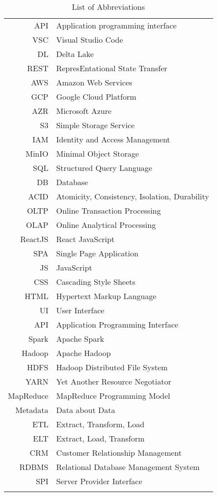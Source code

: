 \begin{longtable}{rl}
API & Application programming interface \\
VSC & Visual Studio Code \\
DL & Delta Lake \\
REST & RepresEntational State Transfer \\
AWS & Amazon Web Services \\
GCP & Google Cloud Platform \\
AZR & Microsoft Azure \\
S3 & Simple Storage Service \\
IAM & Identity and Access Management \\
MinIO & Minimal Object Storage \\
SQL & Structured Query Language \\
DB & Database \\
ACID & Atomicity, Consistency, Isolation, Durability \\
OLTP & Online Transaction Processing \\
OLAP & Online Analytical Processing \\
ReactJS & React JavaScript \\
SPA & Single Page Application \\
JS & JavaScript \\
CSS & Cascading Style Sheets \\
HTML & Hypertext Markup Language \\
UI & User Interface \\
API & Application Programming Interface \\
Spark & Apache Spark \\
Hadoop & Apache Hadoop \\
HDFS & Hadoop Distributed File System \\
YARN & Yet Another Resource Negotiator \\
MapReduce & MapReduce Programming Model \\
Metadata & Data about Data \\
ETL & Extract, Transform, Load \\
ELT & Extract, Load, Transform \\
CRM & Customer Relationship Management \\
RDBMS & Relational Database Management System \\
SPI & Server Provider Interface \\
\caption{List of Abbreviations}\label{tab:abbreviations}
\end{longtable}
